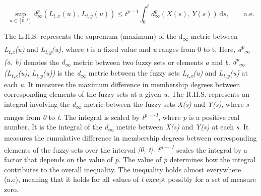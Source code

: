 \documentclass[12pt,a4paper]{report}
\numberwithin{equation}{section}
\begin{document}
\begin{equation}\tag{5.1.6}\label{eq:5.1.6}
\sup_{u\in[0,t]} d_{\infty}^{p}\!\left(L_{t,x}(u),\,L_{t,y}(u)\right)
\le t^{p-1}\int_{0}^{t} d_{\infty}^{p}\!\left(X(s),\,Y(s)\right)\,\mathrm{d}s,
\qquad \text{a.e.}
\end{equation}


The L.H.S. represents the supremum (maximum) of the d\textsubscript{$\infty$}
metric between \emph{L\textsubscript{t,x}(u)} and
\emph{L\textsubscript{t,y}(u),} where \emph{t} is a fixed value and
\emph{u} ranges from 0 to t. Here,
\emph{d\textsuperscript{p}\textsubscript{$\infty$}(a, b)} denotes the
\emph{d\textsubscript{$\infty$}} metric between two fuzzy sets or elements
\emph{a} and \emph{b}.
\emph{d\textsuperscript{p}\textsubscript{$\infty$}(L\textsubscript{t,x}(u)},
\emph{L\textsubscript{t,y}(u))} is the \emph{d\textsubscript{$\infty$}} metric
between the fuzzy sets \emph{L\textsubscript{t,x}(u)} and
\emph{L\textsubscript{t,y}(u)} at each \emph{u}. It measures the maximum
difference in membership degrees between corresponding elements of the
fuzzy sets at a given \emph{u}. The R.H.S. represents an integral
involving the \emph{d\textsubscript{$\infty$}} metric between the fuzzy sets
\emph{X(s)} and \emph{Y(s)}, where \emph{s} ranges from \emph{0} to
\emph{t}. The integral is scaled by \emph{t\textsuperscript{p----1}},
where \emph{p} is a positive real number. It is the integral of the
\emph{d\textsubscript{$\infty$}} metric between \emph{X(s)} and \emph{Y(s)} at
each \emph{s}. It measures the cumulative difference in membership
degrees between corresponding elements of the fuzzy sets over the
interval \emph{{[}0, t{]}. t\textsuperscript{p----1}} scales the integral
by a factor that depends on the value of \emph{p}. The value of \emph{p}
determines how the integral contributes to the overall inequality. The
inequality holds almost everywhere (a.e), meaning that it holds for all
values of \emph{t} except possibly for a set of measure zero.
\end{document}
